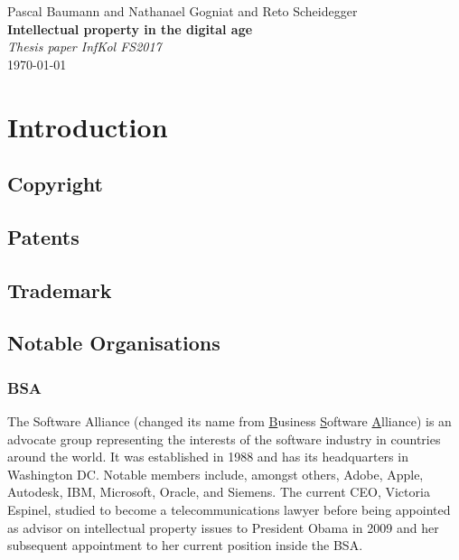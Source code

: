 \documentclass[a4paper]{report}
\newcommand*{\titleAP}{\begingroup %
	\centering
	\vspace*{\baselineskip} %
	
	{\Large Pascal Baumann} and {\Large Nathanael Gogniat} and {\Large Reto Scheidegger}\\[0.167\textheight] %
	
	{\Huge\bfseries Intellectual property in the digital age}\\[\baselineskip]
	
	{\Large \textit{Thesis paper InfKol FS2017}}\\
	\today
	
	\vspace*{3\baselineskip} %
	\endgroup}
\begin{document}
\titleAP

\begin{abstract}
	\blindtext
\end{abstract}
\newpage

\tableofcontents

\newpage

\chapter{Introduction}
\label{ch:Intro}

\section{Copyright}
\label{sec:Copyright}

\section{Patents}
\label{sec:Patents}


\section{Trademark}
\label{sec:Trademark}

\section{Notable Organisations}
\label{sec:Orgas}

\subsection{BSA}
\label{ssec:BSA}
The Software Alliance (changed its name from \underline{B}usiness \underline{S}oftware \underline{A}lliance) is an advocate group representing the interests of the software industry in countries around the world. It was established in 1988 and has its headquarters in Washington DC. Notable members include, amongst others, Adobe, Apple, Autodesk, IBM, Microsoft, Oracle, and Siemens. The current CEO, Victoria Espinel, studied to become a telecommunications lawyer before being appointed as advisor on intellectual property issues to President Obama in 2009 and her subsequent appointment to her current position inside the BSA. \parencite{Rogers2017}
\vspace{\baselineskip}
\end{document}
